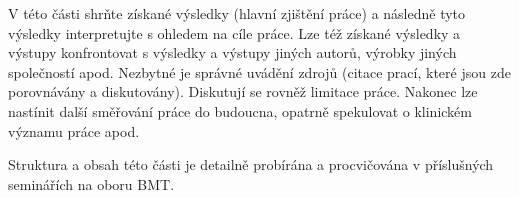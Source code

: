 V této části shrňte získané výsledky (hlavní zjištění práce) a následně tyto výsledky interpretujte s ohledem na cíle práce. 
Lze též získané výsledky a výstupy konfrontovat s výsledky a výstupy jiných autorů, výrobky jiných společností apod. 
Nezbytné je správné uvádění zdrojů (citace prací, které jsou zde porovnávány a diskutovány). 
Diskutují se rovněž limitace práce. 
Nakonec lze nastínit další směřování práce do budoucna, opatrně spekulovat o klinickém významu práce apod.

Struktura a obsah této části je detailně probírána a procvičována v příslušných seminářích na oboru BMT. 
